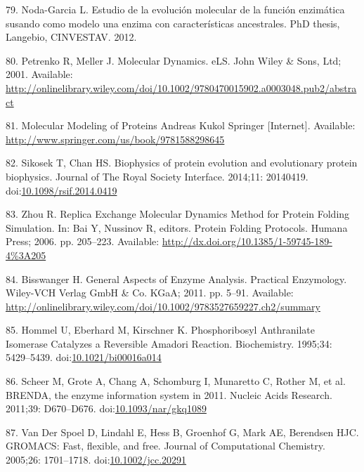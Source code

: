 \documentclass[12pt,twoside]{reedthesis}
\begin{document}
  \hypertarget{ref-nodaux5festudioux5f2012}{}
  79. Noda-Garcia L. Estudio de la evolución molecular de la función
  enzimática susando como modelo una enzima con características
  ancestrales. PhD thesis, Langebio, CINVESTAV. 2012.
  
  \hypertarget{ref-petrenkoux5fmolecularux5f2001}{}
  80. Petrenko R, Meller J. Molecular Dynamics. eLS. John Wiley \& Sons,
  Ltd; 2001. Available:
  \url{http://onlinelibrary.wiley.com/doi/10.1002/9780470015902.a0003048.pub2/abstract}
  
  \hypertarget{ref-kukolux5fmolecularux5f2008}{}
  81. Molecular Modeling of Proteins Andreas Kukol Springer
  {[}Internet{]}. Available:
  \url{http://www.springer.com/us/book/9781588298645}
  
  \hypertarget{ref-sikosekux5fbiophysicsux5f2014}{}
  82. Sikosek T, Chan HS. Biophysics of protein evolution and evolutionary
  protein biophysics. Journal of The Royal Society Interface. 2014;11:
  20140419.
  doi:\href{https://doi.org/10.1098/rsif.2014.0419}{10.1098/rsif.2014.0419}
  
  \hypertarget{ref-baiux5freplicaux5f2006}{}
  83. Zhou R. Replica Exchange Molecular Dynamics Method for Protein
  Folding Simulation. In: Bai Y, Nussinov R, editors. Protein Folding
  Protocols. Humana Press; 2006. pp. 205--223. Available:
  \url{http://dx.doi.org/10.1385/1-59745-189-4\%3A205}
  
  \hypertarget{ref-bisswangerux5fgeneralux5f2011}{}
  84. Bisswanger H. General Aspects of Enzyme Analysis. Practical
  Enzymology. Wiley-VCH Verlag GmbH \& Co. KGaA; 2011. pp. 5--91.
  Available:
  \url{http://onlinelibrary.wiley.com/doi/10.1002/9783527659227.ch2/summary}
  
  \hypertarget{ref-hommelux5fphosphoribosylux5f1995}{}
  85. Hommel U, Eberhard M, Kirschner K. Phosphoribosyl Anthranilate
  Isomerase Catalyzes a Reversible Amadori Reaction. Biochemistry.
  1995;34: 5429--5439.
  doi:\href{https://doi.org/10.1021/bi00016a014}{10.1021/bi00016a014}
  
  \hypertarget{ref-scheerux5fbrendaux5f2011}{}
  86. Scheer M, Grote A, Chang A, Schomburg I, Munaretto C, Rother M, et
  al. BRENDA, the enzyme information system in 2011. Nucleic Acids
  Research. 2011;39: D670--D676.
  doi:\href{https://doi.org/10.1093/nar/gkq1089}{10.1093/nar/gkq1089}
  
  \hypertarget{ref-vanux5fderux5fspoelux5fgromacsux5f2005}{}
  87. Van Der Spoel D, Lindahl E, Hess B, Groenhof G, Mark AE, Berendsen
  HJC. GROMACS: Fast, flexible, and free. Journal of Computational
  Chemistry. 2005;26: 1701--1718.
  doi:\href{https://doi.org/10.1002/jcc.20291}{10.1002/jcc.20291}
  
\end{document}
